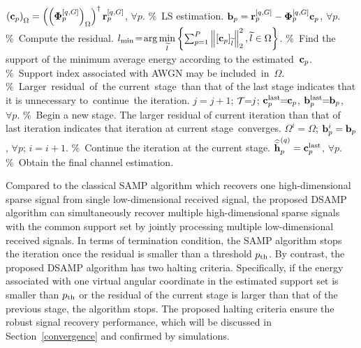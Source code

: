 \documentclass[final]{IEEEtran}
\begin{document}
\begin{algorithm}[!tp]
{\begin{algorithmic}[1]
\STATE $\left( {\bf c}_p \right)_{\Omega} = \left(\left( {\bf{\Phi}}_p^{[q,G]} \right)_{\Omega}\right)^{\dag}
 {\bf r}_p^{[q,G]}$, $\forall p$. {\scriptsize \%~LS estimation.}
\STATE ${\bf b}_p = {\bf r}_p^{[q,G]} - {\bf{\Phi}}_p^{[q,G]} {\bf c}_p$, $\forall p$. {\scriptsize \%~Compute
 the residual.}
\STATE $l_{\rm min}\! = \! \arg \min\limits_{\widetilde l} \left\{ \sum\nolimits_{p=1}^{P}
 \left\| \left[ {\bf c}_p \right]_{\widetilde l} \right\|_2^2 , {\widetilde l} \in \Omega \right\}$.
 {\scriptsize \%~Find the support of the minimum average energy according to the estimated~${\bf c}_p$.}
     {\scriptsize \%~Support index associated with AWGN may be included~in~$\Omega$.}
     {\scriptsize \%~Larger~residual~of~the current~stage~than that of the
 last stage indicates that it is unnecessary to~continue~the iteration.}
     \STATE $j \!\!= \!\!j\!+\!1$; ${\cal{T}}\!\! = \!\!j$; ${\bf c}_p^{\rm{last}}
            \!\!=\!\! {\bf c}_p$, ${\bf b}_p^{\rm{last}}\! \!=\!\! {\bf b}_p$, $\forall p$.
 {\scriptsize \%~Begin a new stage. The larger residual of current iteration than that of last
 iteration indicates that iteration at current stage~converges.}
\ELSE
    \STATE ${\Omega}^i = {\Omega}$; ${\bf b}_p^i = {\bf b}_p$, $\forall p$; $i  = i+1$.
 {\scriptsize \%~Continue the iteration at the current stage.}
\ENDIF
{}
\STATE $\widehat{\bar{\bf h}}_p^{(q)} = {\bf c}_p^{\rm{last}}$, $\forall p$. {\scriptsize \%~Obtain
 the final channel estimation.}
\end{algorithmic}
}
\end{algorithm}

 Compared to the classical SAMP algorithm \cite{SAMP} which recovers one high-dimensional
 sparse signal from single low-dimensional received signal, the proposed DSAMP algorithm
 can simultaneously recover multiple high-dimensional sparse signals with the common
 support set by jointly processing multiple low-dimensional received signals. In terms of
 termination condition, the SAMP algorithm stops the iteration once the residual is smaller
 than a threshold $p_{\rm th}$. By contrast, the proposed DSAMP algorithm has two halting
 criteria. Specifically, if the energy associated with one virtual angular coordinate in
 the estimated support set is smaller than $p_{\rm th}$ or the residual of the current
 stage is larger than that of the previous stage, the algorithm stops. The proposed halting
 criteria ensure the robust signal recovery performance, which will be discussed in
 Section~\ref{convergence} and confirmed by simulations.
\end{document}
